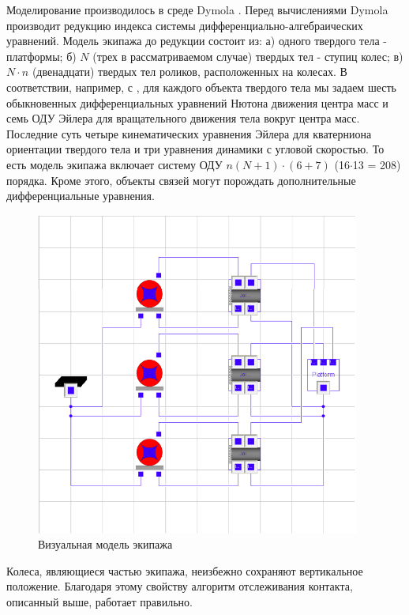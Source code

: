 \documentclass[12pt]{article}
\begin{document}
Моделирование производилось в среде Dymola \cite{DymolaMan}. Перед вычислениями Dymola производит редукцию индекса системы дифферен\-циально\--алгебраичес\-ких уравнений. Модель экипажа до редукции состоит из: а) одного твердого тела - платформы; б) $N$ (трех в рассматриваемом случае) твердых тел - ступиц колес; в) $N\cdot n$ (двенадцати) твердых тел роликов, расположенных на колесах. В соответствии, например, с \cite{kos5}, для каждого объекта твердого тела мы задаем шесть обыкновенных дифференциальных уравнений Нютона движения центра масс и семь ОДУ Эйлера для вращательного движения тела вокруг центра масс. Последние суть четыре кинематических уравнения Эйлера для кватерниона ориентации твердого тела и три уравнения динамики с угловой скоростью. То есть модель экипажа включает систему ОДУ $n(N + 1) \cdot (6+7)$ (16$\cdot$13 = 208) порядка. Кроме этого, объекты связей могут порождать дополнительные дифференциальные уравнения.\\

\begin{figure}[h!]
    \centering
    \includegraphics[width=0.95\textwidth]{content/parts/3_friction/diploma/img/art/kos6_vehicle_model.png}
    \caption{Визуальная модель экипажа}
    \label{fig:kos6_vehicle_model}
\end{figure}

Колеса, являющиеся частью экипажа, неизбежно сохраняют вертикальное положение. Благодаря этому свойству алгоритм отслеживания контакта, описанный выше, работает правильно.\\
\end{document}
